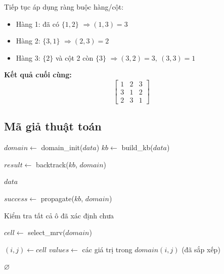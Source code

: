 Tiếp tục áp dụng ràng buộc hàng/cột:

\begin{itemize}
    \item Hàng 1: đã có $\{1,2\}$ $\Rightarrow (1,3)=3$
    \item Hàng 2: $\{3,1\}$ $\Rightarrow (2,3)=2$
    \item Hàng 3: $\{2\}$ và cột 2 còn $\{3\}$ $\Rightarrow (3,2)=3,\ (3,3)=1$
\end{itemize}

\textbf{Kết quả cuối cùng:}
\[
\begin{bmatrix}
1 & 2 & 3 \\
3 & 1 & 2 \\
2 & 3 & 1
\end{bmatrix}
\]

\subsection{Mã giả thuật toán}
\begin{algorithm}[H]
\footnotesize
\caption{FC Solver cho Futoshiki}

$domain \leftarrow$ domain\_init($data$) \;
$kb \leftarrow$ build\_kb($data$) \;

$result \leftarrow$ backtrack($kb$, $domain$) \;



\Return $data$ \;
\end{algorithm}

\begin{algorithm}[H]
\footnotesize
\caption{Backtracking với FC + MRV}

$success \leftarrow$ propagate($kb$, $domain$) \;


Kiểm tra tất cả ô đã xác định chưa \;


$cell \leftarrow$ select\_mrv($domain$) \;


$(i,j) \leftarrow cell$ \;
$values \leftarrow$ các giá trị trong $domain(i,j)$ (đã sắp xếp) \;


\Return $\varnothing$ \;
\end{algorithm}

